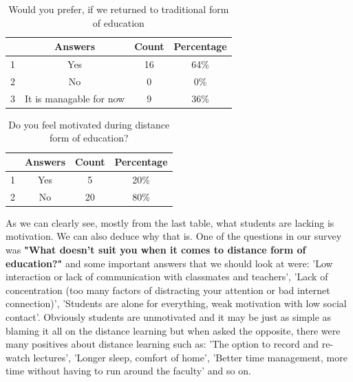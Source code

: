 \documentclass[10pt,twoside,english,a4paper]{article}
\begin{document}
\begin{table}[h!]
\caption{Would you prefer, if we returned to traditional form of education}
\centering
 \begin{tabular}{||c|c|c|c||}
 \hline
  & Answers & Count & Percentage \\ [0.5ex] 
 \hline\hline
 1 & Yes & 16 & 64\% \\ 
 \hline
 2 & No & 0 & 0\% \\
 \hline
 3 & It is managable for now & 9 & 36\% \\
 \hline
\end{tabular}
\end{table}

\begin{table}[h!]
\caption{Do you feel motivated during distance form of education?}
\centering
 \begin{tabular}{||c|c|c|c||}
 \hline
  & Answers & Count & Percentage \\ [0.5ex] 
 \hline\hline
 1 & Yes & 5 & 20\% \\ 
 \hline
 2 & No & 20 & 80\% \\
 \hline
\end{tabular}
\end{table}
As we can clearly see, mostly from the last table, what students are lacking is motivation. We can also deduce why that is. One of the questions in our survey was \textbf{"What doesn't suit you when it comes to distance form of education?"} and some important answers that we should look at were: 'Low interaction or lack of communication with classmates and teachers', 'Lack of concentration (too many factors of distracting your attention or bad internet connection)', 'Students are alone for everything, weak motivation with low social contact'. Obviously students are unmotivated and it may be just as simple as blaming it all on the distance learning but when asked the opposite, there were many positives about distance learning such as: 'The option to record and re-watch lectures', 'Longer sleep, comfort of home', 'Better time management, more time without having to run around the faculty' and so on. 
\end{document}
